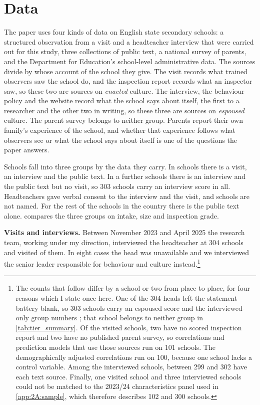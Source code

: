 \section{Data}
\label{sec:p1_data}

The paper uses four kinds of data on English state secondary schools: a structured observation
from a visit and a
headteacher interview that were carried out for this
study, three collections of public text, a national survey of parents, and
the Department for Education's school-level administrative data. The sources divide by whose
account of the school they give.
The visit records what trained observers saw the school do, and the inspection report
records what an inspector saw, so these two are sources on \emph{enacted}
culture. The interview, the behaviour policy and the website record what the
school says about itself, the first to a researcher and the other two in
writing, so these three are sources on \emph{espoused} culture. The parent
survey belongs to neither group. Parents report their own family's experience
of the school, and whether that experience follows what observers see or
what the school says about itself is one of the questions the paper answers.

Schools fall into three groups by the data they carry. In \NTierOne{} schools there is a visit, an interview and the public text. In a further \NTierTwo{} schools there is an interview and the public text but no visit, so 303 schools carry an interview score in all. Headteachers gave verbal consent to the interview and the visit, and schools are not named. For the rest of the schools in the country there is the public text alone.  compares the three groups on intake, size and inspection grade.



\textbf{Visits and interviews.} Between November 2023 and April 2025 the
research team, working under my direction, interviewed the headteacher at
304 schools and visited \NTierOne{} of them. In eight cases the head was
unavailable and we interviewed the senior leader responsible for behaviour
and culture instead.\footnote{The counts that follow differ by a school or
two from place to place, for four reasons which I state once here. One of
the 304 heads left the statement battery blank, so 303 schools carry an espoused score and the interviewed-only group numbers \NTierTwo{}; that school belongs to neither group in \cref{tab:tier_summary}. Of the \NTierOne{}
visited schools, two have no scored inspection report and two have no
published parent survey, so correlations and prediction models that use
those sources run on 101 schools. The demographically adjusted correlations run on 100, because one school lacks a control variable.
Among the interviewed schools, between 299 and 302 have each text source. Finally, one visited school and three
interviewed schools could not be matched to the 2023/24 characteristics
panel used in \cref{app:2A:sample}, which therefore describes 102 and 300
schools.}

